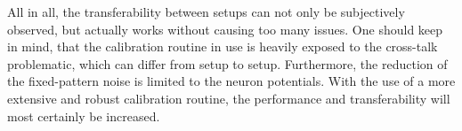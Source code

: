 All in all, the transferability between setups can not only be subjectively observed, but actually works without causing too many issues. One should keep in mind, that the calibration routine in use is heavily exposed to the cross-talk problematic, which can differ from setup to setup. Furthermore, the reduction of the fixed-pattern noise is limited to the neuron potentials. With the use of a more extensive and robust calibration routine, the performance and transferability will most certainly be increased. 

